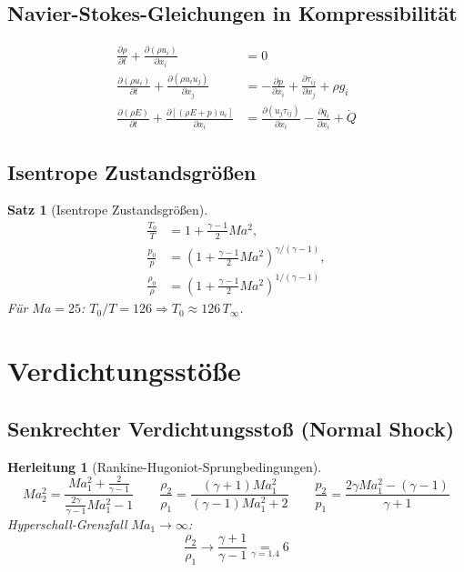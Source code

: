 ﻿\documentclass[12pt,a4paper]{article}
\newtheorem{satz}{Satz}[section]
\newtheorem{herleitung}{Herleitung}[section]
\newcommand{\Ma}{M\!a}
\begin{document}
\subsection{Navier-Stokes-Gleichungen in Kompressibilität}

\begin{align}
  \frac{\partial \rho}{\partial t} + \frac{\partial (\rho u_i)}{\partial x_i} &= 0
  \tag{Kontinuität}\\[4pt]
  \frac{\partial (\rho u_i)}{\partial t} + \frac{\partial (\rho u_i u_j)}{\partial x_j}
  &= -\frac{\partial p}{\partial x_i} + \frac{\partial \tau_{ij}}{\partial x_j} + \rho g_i
  \tag{Impuls}\\[4pt]
  \frac{\partial (\rho E)}{\partial t} + \frac{\partial [(\rho E + p)u_i]}{\partial x_i}
  &= \frac{\partial (u_j \tau_{ij})}{\partial x_i}
    - \frac{\partial q_i}{\partial x_i} + \dot{Q}
  \tag{Energie}
\end{align}

\subsection{Isentrope Zustandsgrößen}

\begin{satz}[Isentrope Zustandsgrößen]
\begin{align}
  \frac{T_0}{T} &= 1 + \frac{\gamma-1}{2}\Ma^2,\\[4pt]
  \frac{p_0}{p} &= \left(1 + \frac{\gamma-1}{2}\Ma^2\right)^{\!\gamma/(\gamma-1)},\\[4pt]
  \frac{\rho_0}{\rho} &= \left(1 + \frac{\gamma-1}{2}\Ma^2\right)^{\!1/(\gamma-1)}
\end{align}
Für $\Ma = 25$: $T_0/T = 126 \Rightarrow T_0 \approx 126\,T_\infty$.
\end{satz}

\section{Verdichtungsstöße}

\subsection{Senkrechter Verdichtungsstoß (Normal Shock)}

\begin{herleitung}[Rankine-Hugoniot-Sprungbedingungen]
\[
  \Ma_2^2 = \frac{\Ma_1^2 + \frac{2}{\gamma-1}}{\frac{2\gamma}{\gamma-1}\Ma_1^2 - 1}
  \qquad
  \frac{\rho_2}{\rho_1} = \frac{(\gamma+1)\Ma_1^2}{(\gamma-1)\Ma_1^2 + 2}
  \qquad
  \frac{p_2}{p_1} = \frac{2\gamma\Ma_1^2 - (\gamma-1)}{\gamma+1}
\]
Hyperschall-Grenzfall $\Ma_1 \to \infty$:
\[
  \frac{\rho_2}{\rho_1} \to \frac{\gamma+1}{\gamma-1}
    \underset{\gamma=1.4}{=} 6
\]
\end{herleitung}
\end{document}
